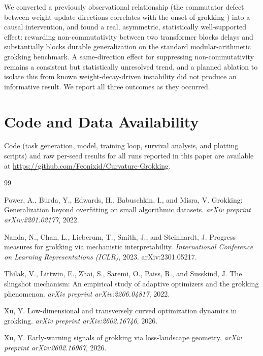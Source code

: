 \documentclass[11pt]{article}
\begin{document}
We converted a previously observational relationship (the commutator
defect between weight-update directions correlates with the onset of
grokking \citep{xu2026a,xu2026b}) into a causal intervention, and found
a real, asymmetric, statistically well-supported effect: rewarding
non-commutativity between two transformer blocks delays and substantially
blocks durable generalization on the standard modular-arithmetic grokking
benchmark. A same-direction effect for suppressing non-commutativity
remains a consistent but statistically unresolved trend, and a planned
ablation to isolate this from known weight-decay-driven instability did
not produce an informative result. We report all three outcomes as they
occurred.

\section*{Code and Data Availability}

Code (task generation, model, training loop, survival analysis, and
plotting scripts) and raw per-seed results for all runs reported in this
paper are available at
\url{https://github.com/Feonixid/Curvature-Grokking}.


\begin{thebibliography}{99}

Power, A., Burda, Y., Edwards, H., Babuschkin, I., and Misra, V.
\newblock Grokking: Generalization beyond overfitting on small algorithmic
datasets.
\newblock \emph{arXiv preprint arXiv:2201.02177}, 2022.

Nanda, N., Chan, L., Lieberum, T., Smith, J., and Steinhardt, J.
\newblock Progress measures for grokking via mechanistic interpretability.
\newblock \emph{International Conference on Learning Representations
(ICLR)}, 2023. arXiv:2301.05217.

Thilak, V., Littwin, E., Zhai, S., Saremi, O., Paiss, R., and Susskind, J.
\newblock The slingshot mechanism: An empirical study of adaptive
optimizers and the grokking phenomenon.
\newblock \emph{arXiv preprint arXiv:2206.04817}, 2022.

Xu, Y.
\newblock Low-dimensional and transversely curved optimization dynamics
in grokking.
\newblock \emph{arXiv preprint arXiv:2602.16746}, 2026.

Xu, Y.
\newblock Early-warning signals of grokking via loss-landscape geometry.
\newblock \emph{arXiv preprint arXiv:2602.16967}, 2026.

\end{thebibliography}
\end{document}
